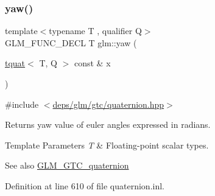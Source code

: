 \subsubsection{\texorpdfstring{yaw()}{yaw()}}
{\footnotesize\ttfamily template$<$typename T , qualifier Q$>$ \\
G\+L\+M\+\_\+\+F\+U\+N\+C\+\_\+\+D\+E\+CL T glm\+::yaw (\begin{DoxyParamCaption}\item[{\hyperlink{structglm_1_1tquat}{tquat}$<$ T, Q $>$ const \&}]{x }\end{DoxyParamCaption})}



{\ttfamily \#include $<$\hyperlink{gtc_2quaternion_8hpp}{deps/glm/gtc/quaternion.\+hpp}$>$}

Returns yaw value of euler angles expressed in radians.


\begin{DoxyTemplParams}{Template Parameters}
{\em T} & Floating-\/point scalar types.\\
\hline
\end{DoxyTemplParams}
\begin{DoxySeeAlso}{See also}
\hyperlink{group__gtc__quaternion}{G\+L\+M\+\_\+\+G\+T\+C\+\_\+quaternion} 
\end{DoxySeeAlso}


Definition at line 610 of file quaternion.\+inl.

